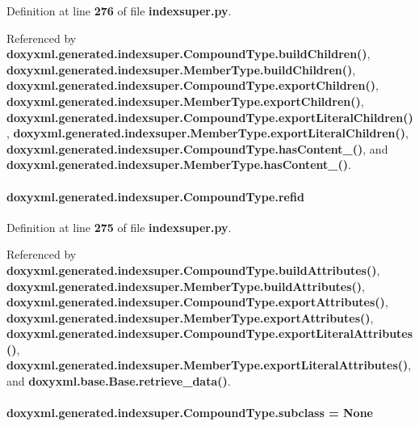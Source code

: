 Definition at line {\bf 276} of file {\bf indexsuper.\+py}.



Referenced by {\bf doxyxml.\+generated.\+indexsuper.\+Compound\+Type.\+build\+Children()}, {\bf doxyxml.\+generated.\+indexsuper.\+Member\+Type.\+build\+Children()}, {\bf doxyxml.\+generated.\+indexsuper.\+Compound\+Type.\+export\+Children()}, {\bf doxyxml.\+generated.\+indexsuper.\+Member\+Type.\+export\+Children()}, {\bf doxyxml.\+generated.\+indexsuper.\+Compound\+Type.\+export\+Literal\+Children()}, {\bf doxyxml.\+generated.\+indexsuper.\+Member\+Type.\+export\+Literal\+Children()}, {\bf doxyxml.\+generated.\+indexsuper.\+Compound\+Type.\+has\+Content\+\_\+()}, and {\bf doxyxml.\+generated.\+indexsuper.\+Member\+Type.\+has\+Content\+\_\+()}.

\paragraph[{refid}]{\setlength{\rightskip}{0pt plus 5cm}doxyxml.\+generated.\+indexsuper.\+Compound\+Type.\+refid}\label{classdoxyxml_1_1generated_1_1indexsuper_1_1CompoundType_acd0623a6f0be9ee213eba79da00ca1cb}


Definition at line {\bf 275} of file {\bf indexsuper.\+py}.



Referenced by {\bf doxyxml.\+generated.\+indexsuper.\+Compound\+Type.\+build\+Attributes()}, {\bf doxyxml.\+generated.\+indexsuper.\+Member\+Type.\+build\+Attributes()}, {\bf doxyxml.\+generated.\+indexsuper.\+Compound\+Type.\+export\+Attributes()}, {\bf doxyxml.\+generated.\+indexsuper.\+Member\+Type.\+export\+Attributes()}, {\bf doxyxml.\+generated.\+indexsuper.\+Compound\+Type.\+export\+Literal\+Attributes()}, {\bf doxyxml.\+generated.\+indexsuper.\+Member\+Type.\+export\+Literal\+Attributes()}, and {\bf doxyxml.\+base.\+Base.\+retrieve\+\_\+data()}.

\paragraph[{subclass}]{\setlength{\rightskip}{0pt plus 5cm}doxyxml.\+generated.\+indexsuper.\+Compound\+Type.\+subclass = None\hspace{0.3cm}{\ttfamily [static]}}\label{classdoxyxml_1_1generated_1_1indexsuper_1_1CompoundType_acc2e63bf2f461028adb1922eff4c32c5}


